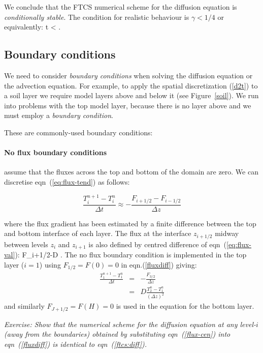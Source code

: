 We conclude that the FTCS numerical scheme for the diffusion equation is
\emph{conditionally stable}.  The condition for realistic behaviour is
$\gamma<1/4$ or equivalently:  
\BEQ \Delta t <  . \EEQ

\subsection{Boundary conditions}

We need to consider \emph{boundary conditions} when solving the
diffusion equation or the advection equation.  For example, to apply
the spatial discretization (\ref{d2t}) to a soil layer we require
model layers above and below it (see Figure~\ref{soil}). We run into
problems with the top model layer, because there is no layer above and
we must employ a {\em boundary condition}.

These are commonly-used boundary conditions:

\paragraph{No flux boundary conditions} 

assume that the fluxes across the top and bottom of the domain are
zero. We can discretise eqn~(\ref{eq:flux-tend}) as follows:

\begin{equation}
	\frac{T^{n+1}_i-T^n_i}{\Delta t} \approx 
	-\frac{F_{i+1/2}-F_{i-1/2}}{\Delta z} 
	\label{fluxdiff}
\end{equation}

where the flux gradient has been estimated by a finite difference
between the top and bottom interface of each layer. The flux at the
interface $z_{i+1/2}$ midway between levels $z_i$ and $z_{i+1}$ is
also defined by centred difference of eqn~(\ref{eq:flux-val}):
\BEQ F_{i+1/2}\approx -D
.
\label{flux-cen}  
\EEQ 
The no flux boundary condition is implemented in the top layer ($i=1$) using
$F_{1/2}=F(0)=0$ in eqn.(\ref{fluxdiff}) giving:
\begin{eqnarray}
	\frac{T^{n+1}_1-T^n_1}{\Delta t} & = & 
	-\frac{F_{3/2}}{\Delta z} \\\nonumber
	& = & D\frac{T^n_2-T^n_1}{(\Delta z)^2}
\end{eqnarray}
and similarly $F_{J+1/2}=F(H)=0$ is used in the equation for the
bottom layer. 

{\em Exercise: Show that the numerical scheme for the diffusion
	equation at any level-$i$ (away from the boundaries) obtained by
	substituting eqn~(\ref{flux-cen}) into eqn~(\ref{fluxdiff}) is
	identical to eqn~(\ref{ftcs:diff}).}

